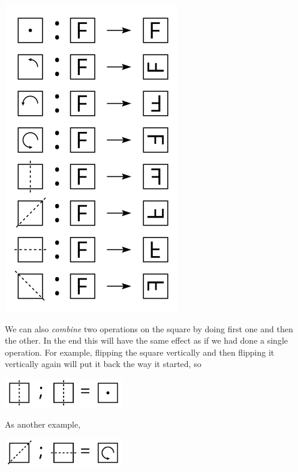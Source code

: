 \documentclass{article}
\begin{document}
\begin{center}
  \includegraphics[width=3in]{d4.png}
\end{center}

\newpage

We can also \emph{combine} two operations on the square by doing first
one and then the other.  In the end this will have the same effect as
if we had done a single operation.  For example, flipping the square
vertically and then flipping it vertically again will put it back the
way it started, so

\begin{center}
  \includegraphics[height=0.5in]{vv.png}
\end{center}

As another example,

\begin{center}
  \includegraphics[height=0.5in]{dh.png}
\end{center}
\end{document}
